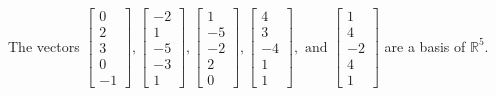 \begin{exercise}
\begin{exerciseStatement}
  \end{exerciseStatement}
  \begin{exerciseAnswer}
   The vectors \(\left[\begin{array}{r}
0 \\
2 \\
3 \\
0 \\
-1
\end{array}\right] , \left[\begin{array}{r}
-2 \\
1 \\
-5 \\
-3 \\
1
\end{array}\right] , \left[\begin{array}{r}
1 \\
-5 \\
-2 \\
2 \\
0
\end{array}\right] , \left[\begin{array}{r}
4 \\
3 \\
-4 \\
1 \\
1
\end{array}\right] , \text{ and } \left[\begin{array}{r}
1 \\
4 \\
-2 \\
4 \\
1
\end{array}\right]\) 
  	 are  a basis of \(\mathbb{R}^5\).
  


  \end{exerciseAnswer}
\end{exercise}